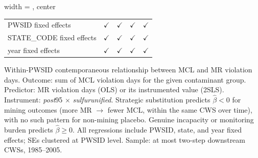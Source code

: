 \begin{table}[htbp]
\begin{adjustbox}{width = \textwidth, center}
\begin{tabular}{lcccc}
          \\
         
         PWSID fixed effects                      & $\checkmark$  & $\checkmark$  & $\checkmark$  & $\checkmark$\\   
         STATE\_CODE fixed effects                & $\checkmark$  & $\checkmark$  & $\checkmark$  & $\checkmark$\\   
         year fixed effects                       & $\checkmark$  & $\checkmark$  & $\checkmark$  & $\checkmark$\\   
         
         \bottomrule
         
      \end{tabular}
      
      
      
   \end{adjustbox}
      {\tiny\linespread{1}\selectfont \par \raggedright 
   Within-PWSID contemporaneous relationship between MCL and MR violation days. Outcome: sum of MCL violation days for the given contaminant group. Predictor: MR violation days (OLS) or its instrumented value (2SLS). Instrument: \textit{post}95$\,\times\,$\textit{sulfur\textunderscore unified}. Strategic substitution predicts $\hat{\beta} < 0$ for mining outcomes (more MR $\rightarrow$ fewer MCL, within the same CWS over time), with no such pattern for non-mining placebo. Genuine incapacity or monitoring burden predicts $\hat{\beta} \geq 0$. All regressions include PWSID, state, and year fixed effects; SEs clustered at PWSID level. Sample: at most two-step downstream CWSs, 1985--2005.}
   
\end{table}


